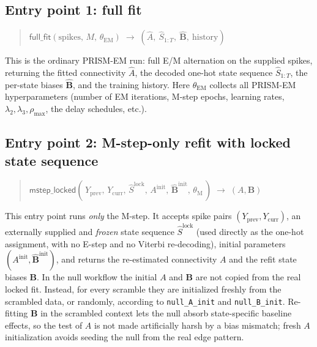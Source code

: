 \documentclass[11pt]{article}
\begin{document}
\subsection{Entry point 1: full fit}
\label{sec:ep1}

\begin{quote}
\(\textsf{full\_fit}(\text{spikes},\,M,\,\theta_{\text{EM}})
\;\longrightarrow\;(\hat A,\ \hat S_{1:T},\ \hat{\mathbf B},\ \text{history})\)
\end{quote}

This is the ordinary PRISM-EM run: full E/M alternation on the supplied
spikes, returning the fitted connectivity \(\hat A\), the decoded one-hot
state sequence \(\hat S_{1:T}\), the per-state biases \(\hat{\mathbf B}\),
and the training history. Here \(\theta_{\text{EM}}\) collects all PRISM-EM
hyperparameters (number of EM iterations, M-step epochs, learning rates,
\(\lambda_2,\lambda_3,\rho_{\max}\), the delay schedules, etc.).

\subsection{Entry point 2: M-step-only refit with locked state sequence}
\label{sec:ep2}

\begin{quote}
\(\textsf{mstep\_locked}(\,Y_{\text{prev}},\,Y_{\text{curr}},\,\hat S^{\text{lock}},\,
A^{\text{init}},\,\hat{\mathbf B}^{\text{init}},\,\theta_{\text{M}}\,)
\;\longrightarrow\;(A,\mathbf B)\)
\end{quote}

This entry point runs \emph{only} the M-step. It accepts spike pairs
\((Y_{\text{prev}},Y_{\text{curr}})\), an externally supplied and
\emph{frozen} state sequence \(\hat S^{\text{lock}}\) (used directly as the
one-hot assignment, with no E-step and no Viterbi re-decoding), initial
parameters \((A^{\text{init}},\hat{\mathbf B}^{\text{init}})\), and returns
the re-estimated connectivity \(A\) and the refit state biases
\(\mathbf B\). In the null workflow the initial \(A\) and \(\mathbf B\) are
not copied from the real locked fit. Instead, for every scramble they
are initialized freshly from the scrambled data, or randomly, according to
\texttt{null\_A\_init} and \texttt{null\_B\_init}. Re-fitting
\(\mathbf B\) in the scrambled context lets the null absorb state-specific
baseline effects, so the test of \(A\) is not made artificially harsh by a
bias mismatch; fresh \(A\) initialization avoids seeding the null from the
real edge pattern.
\end{document}
